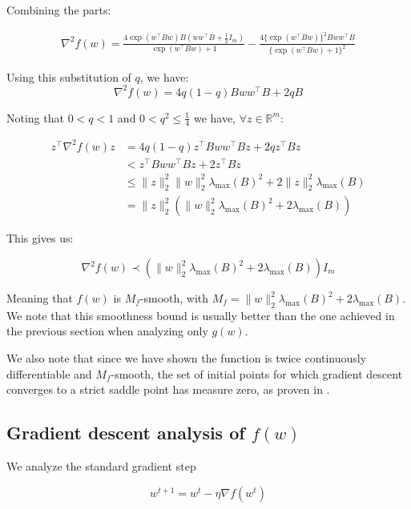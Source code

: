 \documentclass[11pt]{article}
\begin{document}
Combining the parts:

\begin{align*}
    \nabla^2 f(w) = \frac{4 \exp(w^{\top}Bw)B(ww^{\top}B + \frac{1}{2}I_m)}{\exp(w^{\top}Bw) + 1} - \frac{4 \{\exp(w^{\top}Bw)\}^2 Bww^{\top}B }{\{\exp(w^{\top}Bw) + 1\}^2}
\end{align*}

Using this substitution of $q$,  we have:
\begin{equation}
    \nabla^2 f(w) = 4q(1-q)Bww^{\top}B + 2qB
\end{equation}

Noting that $0 < q < 1$ and $0 < q^2 \leq \frac{1}{4}$ we have, $\forall z \in \mathbb{R}^m$:

\begin{align*}
z^{\top} \nabla^2 f(w) z 
&= 4q(1-q) z^{\top} Bww^{\top}B z + 2q z^{\top} B z \\
&< z^{\top} Bww^{\top}B z + 2 z^{\top} B z \\
&\leq \|z\|_2^2 \|w\|_2^2 \lambda_{\max} (B)^2 + 2 \|z\|_2^2 \lambda_{\max} (B) \\
&= \|z\|_2^2 ( \|w\|_2^2 \lambda_{\max} (B)^2 + 2 \lambda_{\max} (B) ) 
\end{align*}

This gives us:

\begin{equation}
    \nabla^2 f(w) \prec ( \|w\|_2^2 \lambda_{\max} (B)^2 + 2 \lambda_{\max} (B)) I_m
\end{equation}

Meaning that $f(w)$ is $M_f$-smooth, with $M_f = \|w\|_2^2 \lambda_{\max} (B)^2 + 2 \lambda_{\max} (B)$. We note that this smoothness bound is usually better than the one achieved in the previous section when analyzing only $g(w)$.

We also note that since we have shown the function is twice continuously differentiable and $M_f$-smooth, the set of initial points for which gradient descent converges to a strict saddle point has measure zero, as proven in \cite{lee_gradient_2016}.

\subsection{Gradient descent analysis of $f(w)$}
\label{sec:grad_descent}

We analyze the standard gradient step

\begin{equation}
    w^{t+1} = w^t - \eta \nabla f(w^t)
\end{equation}
\end{document}
